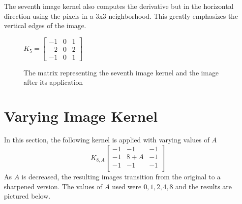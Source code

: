 \documentclass[12pt,letterpaper]{article}
\begin{document}
The seventh image kernel also computes the derivative but in the horizontal direction using the pixels in a 3x3 neighborhood. This greatly emphasizes the vertical edges of the image.
\begin{figure}[ht]
\centering
$K_5 = \begin{bmatrix}
-1 & 0 & 1\\
-2 & 0 & 2\\
-1 & 0 & 1
\end{bmatrix}$
\hspace{2cm} 
\caption{\small{The matrix representing the seventh image kernel and the image after its application}
\label{fig:ker7} }
\end{figure}

\clearpage 
\newpage

\section{Varying Image Kernel}
In this section, the following kernel is applied with varying values of $A$ \[
K_{8,A}\begin{bmatrix}
-1 & -1 & -1 \\
-1 & 8 + A & -1\\
-1 & -1 & -1 \\
\end{bmatrix}
\]
As $A$ is decreased, the resulting images transition from the original to a sharpened version. The values of $A$ used were $0, 1, 2, 4, 8$ and the results are pictured below.
\end{document}
